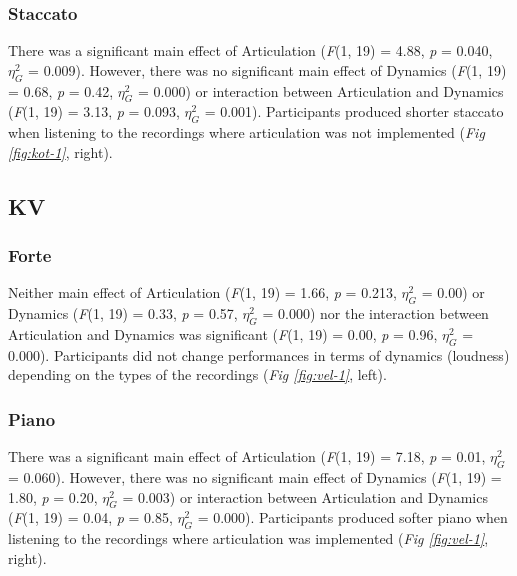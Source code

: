 \documentclass[
  man]{apa6}
\begin{document}
\hypertarget{staccato}{%
\subsubsection{Staccato}\label{staccato}}

There was a significant main effect of Articulation (\emph{F}(1, 19) = 4.88, \emph{p} = 0.040, \(\eta_G^2\) = 0.009). However, there was no significant main effect of Dynamics (\emph{F}(1, 19) = 0.68, \emph{p} = 0.42, \(\eta_G^2\) = 0.000) or interaction between Articulation and Dynamics (\emph{F}(1, 19) = 3.13, \emph{p} = 0.093, \(\eta_G^2\) = 0.001). Participants produced shorter staccato when listening to the recordings where articulation was not implemented (\emph{Fig \ref{fig:kot-1}}, right).

\hypertarget{kv}{%
\subsection{KV}\label{kv}}

\hypertarget{forte}{%
\subsubsection{Forte}\label{forte}}

Neither main effect of Articulation (\emph{F}(1, 19) = 1.66, \emph{p} = 0.213, \(\eta_G^2\) = 0.00) or Dynamics (\emph{F}(1, 19) = 0.33, \emph{p} = 0.57, \(\eta_G^2\) = 0.000) nor the interaction between Articulation and Dynamics was significant (\emph{F}(1, 19) = 0.00, \emph{p} = 0.96, \(\eta_G^2\) = 0.000). Participants did not change performances in terms of dynamics (loudness) depending on the types of the recordings (\emph{Fig \ref{fig:vel-1}}, left).

\hypertarget{piano}{%
\subsubsection{Piano}\label{piano}}

There was a significant main effect of Articulation (\emph{F}(1, 19) = 7.18, \emph{p} = 0.01, \(\eta_G^2\) = 0.060). However, there was no significant main effect of Dynamics (\emph{F}(1, 19) = 1.80, \emph{p} = 0.20, \(\eta_G^2\) = 0.003) or interaction between Articulation and Dynamics (\emph{F}(1, 19) = 0.04, \emph{p} = 0.85, \(\eta_G^2\) = 0.000). Participants produced softer piano when listening to the recordings where articulation was implemented (\emph{Fig \ref{fig:vel-1}}, right).
\end{document}
